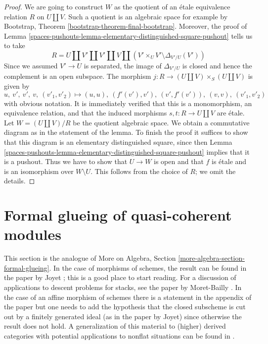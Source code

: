 \begin{proof}
We are going to construct $W$ as the quotient of an \'etale
equivalence relation $R$ on $U \amalg V$. Such a quotient is an
algebraic space for example by
Bootstrap, Theorem \ref{bootstrap-theorem-final-bootstrap}.
Moreover, the proof of
Lemma \ref{spaces-pushouts-lemma-elementary-distinguished-square-pushout} tells us to take
$$
R = U \amalg V' \amalg V' \amalg V \amalg
(V' \times_U V' \setminus \Delta_{V'/U}(V'))
$$
Since we assumed $V' \to U$ is separated, the image of
$\Delta_{V'/U}$ is closed and hence the complement is an
open subspace. The morphism $j : R \to (U \amalg V) \times_S (U \amalg V)$
is given by
$$
u,\ v',\ v',\ v,\ (v'_1, v'_2) \mapsto
(u, u),\ (f'(v'), v'),\ (v', f'(v')),\ (v, v),\ (v'_1, v'_2)
$$
with obvious notation. It is immediately verified that this is a
monomorphism, an equivalence relation, and that the induced morphisms
$s, t : R \to U \amalg V$ are \'etale. Let
$W = (U \amalg V)/R$ be the quotient algebraic space.
We obtain a commutative diagram as in the statement of the lemma.
To finish the proof it suffices to show that this diagram is
an elementary distinguished square, since then
Lemma \ref{spaces-pushouts-lemma-elementary-distinguished-square-pushout}
implies that it is a pushout.
Thus we have to show that $U \to W$ is open and that
$f$ is \'etale and is an isomorphism over $W \setminus U$.
This follows from the choice of $R$; we omit the details.
\end{proof}

\section{Formal glueing of quasi-coherent modules}
\label{spaces-pushouts-section-formal-glueing}
This section is the analogue of
More on Algebra, Section \ref{more-algebra-section-formal-glueing}.
In the case of morphisms of schemes, the result can be found in
the paper by Joyet \cite{Joyet}; this is a good place to start reading.
For a discussion of applications to descent problems for stacks, see the
paper by Moret-Bailly \cite{MB}. In the case of an affine
morphism of schemes there is a statement in the appendix of the paper
\cite{Ferrand-Raynaud} but one needs to add the hypothesis
that the closed subscheme is cut out by a finitely generated
ideal (as in the paper by Joyet) since otherwise the result does not hold.
A generalization of this material to (higher) derived categories
with potential applications to nonflat situations
can be found in \cite[Section 5]{Bhatt-Algebraize}.

